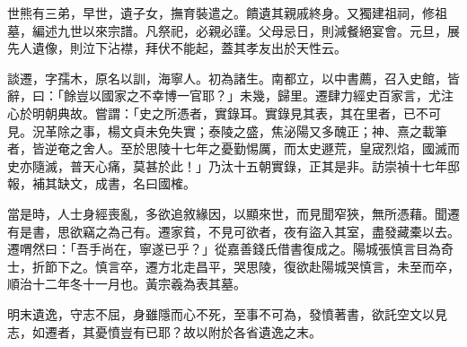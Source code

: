 \begin{pinyinscope}
世熊有三弟，早世，遺子女，撫育裝遣之。饋遺其親戚終身。又獨建祖祠，修祖墓，編述九世以來宗譜。凡祭祀，必親必謹。父母忌日，則減餐絕宴會。元旦，展先人遺像，則泣下沾襟，拜伏不能起，蓋其孝友出於天性云。

談遷，字孺木，原名以訓，海寧人。初為諸生。南都立，以中書薦，召入史館，皆辭，曰：「餘豈以國家之不幸博一官耶？」未幾，歸里。遷肆力經史百家言，尤注心於明朝典故。嘗謂：「史之所憑者，實錄耳。實錄見其表，其在里者，已不可見。況革除之事，楊文貞未免失實；泰陵之盛，焦泌陽又多醜正；神、熹之載筆者，皆逆奄之舍人。至於思陵十七年之憂勤惕厲，而太史遯荒，皇宬烈焰，國滅而史亦隨滅，普天心痛，莫甚於此！」乃汰十五朝實錄，正其是非。訪崇禎十七年邸報，補其缺文，成書，名曰國榷。

當是時，人士身經喪亂，多欲追敘緣因，以顯來世，而見聞窄狹，無所憑藉。聞遷有是書，思欲竊之為己有。遷家貧，不見可欲者，夜有盜入其室，盡發藏橐以去。遷喟然曰：「吾手尚在，寧遂已乎？」從嘉善錢氏借書復成之。陽城張慎言目為奇士，折節下之。慎言卒，遷方北走昌平，哭思陵，復欲赴陽城哭慎言，未至而卒，順治十二年冬十一月也。黃宗羲為表其墓。

明末遺逸，守志不屈，身雖隱而心不死，至事不可為，發憤著書，欲託空文以見志，如遷者，其憂憤豈有已耶？故以附於各省遺逸之末。


\end{pinyinscope}